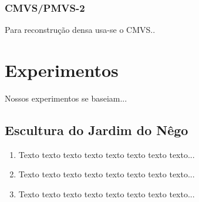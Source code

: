 \documentclass[table, usenames, svgnames, xcolor=dvipsnames]{beamer}
\begin{document}
\subsubsection{CMVS/PMVS-2}

\begin{frame} 
	\begin{center}
Para reconstrução densa usa-se o CMVS..
	\end{center}
\end{frame}

\section{Experimentos}

\begin{frame}
	\begin{center}
		Nossos experimentos se baseiam...
	\end{center}
\end{frame}


\subsection{Escultura do Jardim do Nêgo}

\begin{frame}
	\begin{enumerate}
    	\item Texto texto texto texto texto texto texto texto...
		\\[0.5em]

    	\item Texto texto texto texto texto texto texto texto...
		\\[0.5em]
    	
		\item Texto texto texto texto texto texto texto texto...
		\\[0.5em]
	\end{enumerate}
\end{frame}

\end{document}
